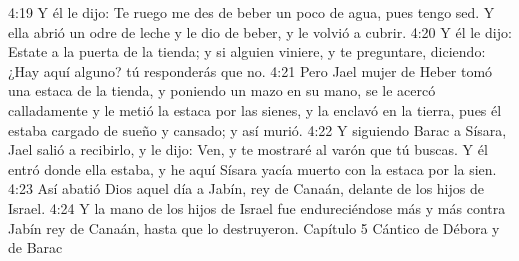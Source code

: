 4:19 Y él le dijo: Te ruego me des de beber un poco de agua, pues tengo sed. Y ella abrió un odre de leche y le dio de beber, y le volvió a cubrir.  
4:20 Y él le dijo: Estate a la puerta de la tienda; y si alguien viniere, y te preguntare, diciendo: ¿Hay aquí alguno? tú responderás que no.  
4:21 Pero Jael mujer de Heber tomó una estaca de la tienda, y poniendo un mazo en su mano, se le acercó calladamente y le metió la estaca por las sienes, y la enclavó en la tierra, pues él estaba cargado de sueño y cansado; y así murió.  
4:22 Y siguiendo Barac a Sísara, Jael salió a recibirlo, y le dijo: Ven, y te mostraré al varón que tú buscas. Y él entró donde ella estaba, y he aquí Sísara yacía muerto con la estaca por la sien.  
4:23 Así abatió Dios aquel día a Jabín, rey de Canaán, delante de los hijos de Israel.  
4:24 Y la mano de los hijos de Israel fue endureciéndose más y más contra Jabín rey de Canaán, hasta que lo destruyeron.  
Capítulo 5
Cántico de Débora y de Barac  

